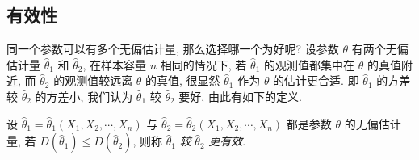 \subsection{有效性}

同一个参数可以有多个无偏估计量, 那么选择哪一个为好呢? 设参数 $ \theta $ 有两个无偏估计量 $ \hat{\theta}_{1} $ 和 $ \hat{\theta}_{2}$, 
在样本容量 $ n $ 相同的情况下, 若 $ \hat{\theta}_{1} $ 的观测值都集中在 $ \theta $ 的真值附近, 
而 $\hat{\theta}_{2}$ 的观测值较远离 $\theta$ 的真值, 很显然 $\hat{\theta}_{1}$ 作为 $\theta$ 的估计更合适.
即 $\hat{\theta}_{1}$ 的方差较 $\hat{\theta}_{2}$ 的方差小, 我们认为 $\hat{\theta}_{1}$ 较 $\hat{\theta}_{2}$ 要好, 由此有如下的定义.

\begin{definition}[有效性]
    设 $ \hat{\theta}_{1}=\hat{\theta}_{1}\left(X_{1}, X_{2}, \cdots, X_{n}\right) $ 与 $ \hat{\theta}_{2}=\hat{\theta}_{2}\left(X_{1}, X_{2}, \cdots, X_{n}\right)$
    都是参数 $ \theta $ 的无偏估计量, 若 $ D\left(\hat{\theta}_{1}\right) \leqslant D\left(\hat{\theta}_{2}\right) $, 则称 $ \hat{\theta}_{1} $ \textit{较} $ \hat{\theta}_{2} $ \textit{更有效}.
\end{definition}

    

